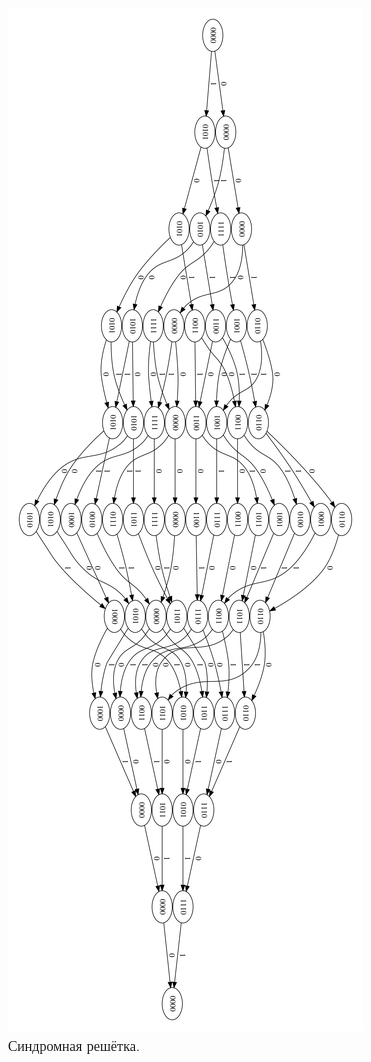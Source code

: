 \documentclass{article}
\begin{document}
\begin{figure}[p]
    \centering
    \includegraphics[height=0.95\textheight]{h.png}
    \caption{Синдромная решётка.}
\end{figure}
\end{document}
